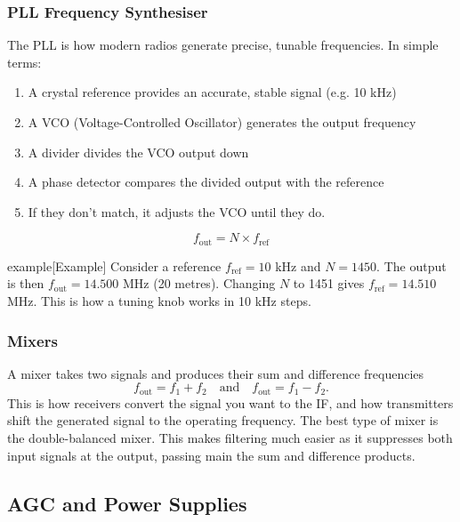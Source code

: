 \documentclass{article}
\begin{document}
\subsubsection{PLL Frequency Synthesiser}
The PLL is how modern radios generate precise, tunable frequencies. In simple terms:
\begin{enumerate}
    \item A crystal reference provides an accurate, stable signal (e.g. 10 kHz)
    \item A VCO (Voltage-Controlled Oscillator) generates the output frequency
    \item A divider divides the VCO output down
    \item A phase detector compares the divided output with the reference
    \item If they don't match, it adjusts the VCO until they do.
\end{enumerate}

\[
    f_{\text{out}}=N\times f_{\text{ref}}
\]
\begin{callout}{example}[Example]
    Consider a reference $f_{\text{ref}}=10$ kHz and $N=1450$. The output is then $f_{\text{out}}=14.500$ MHz (20 metres). Changing $N$ to 1451 gives $f_{\text{ref}}=14.510$ MHz. This is how a tuning knob works in 10 kHz steps.
\end{callout}

\subsubsection{Mixers}
A mixer takes two signals and produces their sum and difference frequencies
\[
    f_{\text{out}}=f_1+f_2\quad \text{and}\quad f_{\text{out}}=f_1-f_2.
\]
This is how receivers convert the signal you want to the IF, and how transmitters shift the generated signal to the operating frequency. The best type of mixer is the double-balanced mixer. This makes filtering much easier as it suppresses both input signals at the output, passing main the sum and difference products.

\subsection{AGC and Power Supplies}
\end{document}
